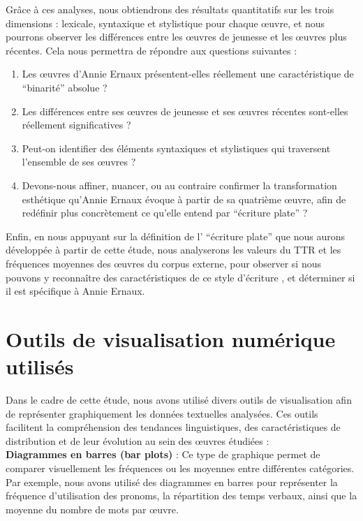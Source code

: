 Grâce à ces analyses, nous obtiendrons des résultats quantitatifs sur les trois dimensions : lexicale, syntaxique et stylistique pour chaque œuvre, et nous pourrons observer les différences entre les œuvres de jeunesse et les œuvres plus récentes. Cela nous permettra de répondre aux questions suivantes :
\begin{enumerate}
    \item Les œuvres d'Annie Ernaux présentent-elles réellement une caractéristique de ``binarité'' absolue ?
    \item Les différences entre ses œuvres de jeunesse et ses œuvres récentes sont-elles réellement significatives ?
    \item Peut-on identifier des éléments syntaxiques et stylistiques qui traversent l'ensemble de ses œuvres ?
    \item Devons-nous affiner, nuancer, ou au contraire confirmer la transformation esthétique qu'Annie Ernaux évoque à partir de sa quatrième œuvre, afin de redéfinir plus concrètement ce qu'elle entend par ``écriture plate'' ?
\end{enumerate}


Enfin, en nous appuyant sur la définition de l' ``écriture plate'' que nous aurons développée à partir de cette étude, nous analyserons les valeurs du TTR et les fréquences moyennes des œuvres du corpus externe, pour observer si nous pouvons y reconnaître des caractéristiques de ce style d'écriture , et déterminer si il est spécifique à Annie Ernaux.

\section{Outils de visualisation numérique utilisés}

Dans le cadre de cette étude, nous avons utilisé divers outils de visualisation afin de représenter graphiquement les données textuelles analysées. Ces outils facilitent la compréhension des tendances linguistiques, des caractéristiques de distribution et de leur évolution au sein des œuvres étudiées :\\


\textbf{Diagrammes en barres (bar plots)} : Ce type de graphique permet de comparer visuellement les fréquences ou les moyennes entre différentes catégories. Par exemple, nous avons utilisé des diagrammes en barres pour représenter la fréquence d’utilisation des pronoms, la répartition des temps verbaux, ainsi que la moyenne du nombre de mots par œuvre.\\

